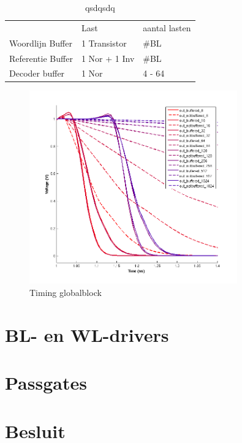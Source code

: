 \begin{table}
\begin{center}
\begin{tabular}{lll}
 & Last & aantal lasten\\
Woordlijn Buffer & 1 Transistor &  \#BL\\
Referentie Buffer & 1 Nor + 1 Inv &  \#BL\\
Decoder buffer & 1 Nor & 4 - 64
\end{tabular}\label{tab:buffer}
\end{center}
\caption{qsdqsdq}
\end{table}

\begin{figure}[!ht]
  \centering
  \includegraphics[width=0.8\textwidth]{../fig/hfdst-buffers-refbuffer.png}
  \caption{Timing globalblock}
  \label{fig:refbuffer}
\end{figure}

\section{BL- en WL-drivers}

\section{Passgates}


\section{Besluit}

